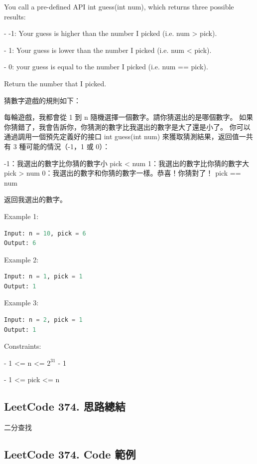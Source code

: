 \documentclass[10pt,UTF8]{ctexart}
\begin{document}
You call a pre-defined API int guess(int num), which returns three possible results:

- -1: Your guess is higher than the number I picked (i.e. num > pick).

- 1: Your guess is lower than the number I picked (i.e. num < pick).

- 0: your guess is equal to the number I picked (i.e. num == pick).

Return the number that I picked.

猜數字遊戲的規則如下：

每輪遊戲，我都會從 1 到 n 隨機選擇一個數字。請你猜選出的是哪個數字。
如果你猜錯了，我會告訴你，你猜測的數字比我選出的數字是大了還是小了。
你可以通過調用一個預先定義好的接口 int guess(int num) 來獲取猜測結果，返回值一共有 3 種可能的情況（-1，1 或 0）：

-1：我選出的數字比你猜的數字小 pick < num
1：我選出的數字比你猜的數字大 pick > num
0：我選出的數字和你猜的數字一樣。恭喜！你猜對了！ pick == num

返回我選出的數字。

Example 1:

\begin{lstlisting}[language={python}]
Input: n = 10, pick = 6
Output: 6
\end{lstlisting}

Example 2:

\begin{lstlisting}[language={python}]
Input: n = 1, pick = 1
Output: 1
\end{lstlisting}

Example 3:

\begin{lstlisting}[language={python}]
Input: n = 2, pick = 1
Output: 1
\end{lstlisting}

Constraints:

- 1 <= n <= $2^31$ - 1

- 1 <= pick <= n



\subsection{LeetCode 374. 思路總結}

二分查找

\subsection{LeetCode 374. Code 範例}
\end{document}
